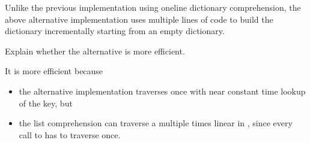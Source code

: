 \documentclass[letterpaper,10pt,english]{sphinxmanual}
\begin{document}
\begin{sphinxVerbatim}[commandchars=\\\{\}]
 
      
        
        \PYG{p}{[}\PYG{p}{]}  \PYG{p}{[}\PYG{p}{]}        
     

\end{sphinxVerbatim}

\noindent{}

 Unlike the previous implementation using one\sphinxhyphen{}line dictionary comprehension, the above alternative implementation uses multiple lines of code to build the dictionary incrementally starting from an empty dictionary.

\begin{sphinxVerbatim}[commandchars=\\\{\}]
 
           
\end{sphinxVerbatim}

Explain whether the alternative is more efficient.

It is more efficient because
\begin{itemize}
\item {} 
the alternative implementation traverses  once with near constant time lookup of the key, but

\item {} 
the list comprehension can traverse  a multiple times linear in , since every call to  has to traverse  once.

\end{itemize}
\end{document}
